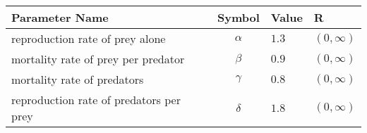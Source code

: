 \begin{tabular}{lcll}
\hline
 Parameter Name                          &  Symbol  & Value   & R             \\
\hline
 reproduction rate of prey alone         & $\alpha$ & $1.3$   & $(0, \infty)$ \\
 mortality rate of prey per predator     & $\beta$  & $0.9$   & $(0, \infty)$ \\
 mortality rate of predators             & $\gamma$ & $0.8$   & $(0, \infty)$ \\
 reproduction rate of predators per prey & $\delta$ & $1.8$   & $(0, \infty)$ \\
\hline
\end{tabular}